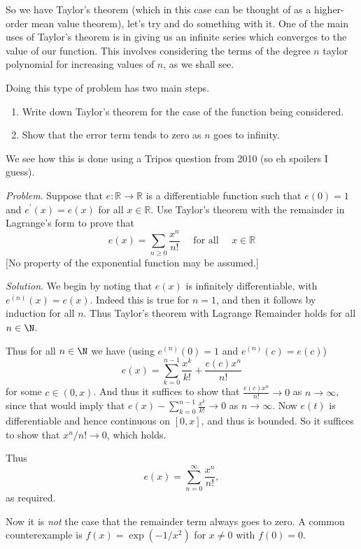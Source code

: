 \documentclass[a4paper]{scrartcl}
\begin{document}
So we have Taylor's theorem (which in this case can be thought of as a higher-order mean value theorem), let's try and do something with it. One of the main uses of Taylor's theorem is in giving us an infinite series which converges to the value of our function. This involves considering the terms of the degree $n$ taylor polynomial for increasing values of $n$, as we shall see.

Doing this type of problem has two main steps.
\begin{enumerate}
	\item Write down Taylor's theorem for the case of the function being considered.
	\item Show that the error term tends to zero as $n$ goes to infinity.
\end{enumerate}
We see how this is done using a Tripos question from 2010 (so eh spoilers I guess).

\begin{example}
\emph{Problem}. Suppose that $e: \mathbb{R} \rightarrow \mathbb{R}$ is a differentiable function such that $e(0)=1$ and $e^{\prime}(x)=e(x)$ for all $x \in \mathbb{R}$. Use Taylor's theorem with the remainder in Lagrange's form to prove that
$$
e(x)=\sum_{n \geqslant 0} \frac{x^{n}}{n !} \quad \text { for all } \quad x \in \mathbb{R}
$$
[No property of the exponential function may be assumed.]

\emph{Solution}. We begin by noting that $e(x)$ is infinitely differentiable, with $e^{(n)}(x) = e(x)$. Indeed this is true for $n = 1$, and then it follows by induction for all $n$. Thus Taylor's theorem with Lagrange Remainder holds for all $n \in \N$.

Thus for all $n \in \N$ we have (using $e^{(n)}(0) = 1$ and $e^{(n)}(c) = e(c)$)
$$
e(x) = \sum_{k = 0}^{n - 1}\frac{x^k}{k!} + \frac{e(c) x^n}{n!} 
$$
for some $c \in (0, x)$.
And thus it suffices to show that $\frac{e(c)x^n}{n!} \rightarrow 0$ as $n \rightarrow \infty$, since that would imply that $e(x) - \sum_{k = 0}^{n - 1} \frac{x^k}{k!} \rightarrow 0$ as $n \rightarrow \infty$.
Now $e(t)$ is differentiable and hence continuous on $[0, x]$, and thus is bounded. So it suffices to show that $x^n/n! \rightarrow 0$, which holds.

Thus
$$
e(x) = \sum_{n = 0}^{\infty} \frac{x^n}{n!},
$$
as required.
\end{example}


Now it is \emph{not} the case that the remainder term always goes to zero. A common counterexample is $f(x) = \exp(-1/x^2)$ for $x \neq 0$ with $f(0) = 0$.
\end{document}
